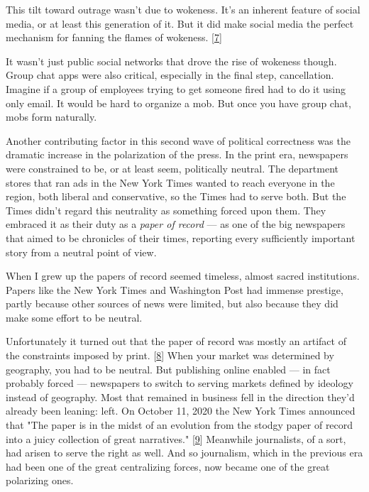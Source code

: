 This tilt
                  toward outrage wasn't due to wokeness. It's an inherent
                  feature of social media, or at least this generation of it.
                  But it did make social media the perfect mechanism for fanning
                  the flames of wokeness.
                  [\href{\#f7n}{7}]

It wasn't just public social networks that drove
                  the rise of wokeness though. Group chat apps were also
                  critical, especially in the final step, cancellation. Imagine
                  if a group of employees trying to get someone fired had to do
                  it using only email. It would be hard to organize a mob. But
                  once you have group chat, mobs form naturally.

Another
                  contributing factor in this second wave of political
                  correctness was the dramatic increase in the polarization of
                  the press. In the print era, newspapers were constrained to
                  be, or at least seem, politically neutral. The department
                  stores that ran ads in the New York Times wanted to reach
                  everyone in the region, both liberal and conservative, so the
                  Times had to serve both. But the Times didn't regard this
                  neutrality as something forced upon them. They embraced it as
                  their duty as a \emph{paper of record} --- as one of the
                  big newspapers that aimed to be chronicles of their times,
                  reporting every sufficiently important story from a neutral
                  point of view.

When I grew up the papers of record
                  seemed timeless, almost sacred institutions. Papers like the
                  New York Times and Washington Post had immense prestige,
                  partly because other sources of news were limited, but also
                  because they did make some effort to be neutral.

Unfortunately
                  it turned out that the paper of record was mostly an artifact
                  of the constraints imposed by print.
                  [\href{\#f8n}{8}]
                  When your market was determined by geography, you had to be
                  neutral. But publishing online enabled --- in fact
                  probably forced --- newspapers to switch to serving
                  markets defined by ideology instead of geography. Most that
                  remained in business fell in the direction they'd already been
                  leaning: left. On October 11, 2020 the New York Times
                  announced that "The paper is in the midst of an evolution from
                  the stodgy paper of record into a juicy collection of great
                  narratives."
                  [\href{\#f9n}{9}]
                  Meanwhile journalists, of a sort, had arisen to serve the
                  right as well. And so journalism, which in the previous era
                  had been one of the great centralizing forces, now became one
                  of the great polarizing ones.

